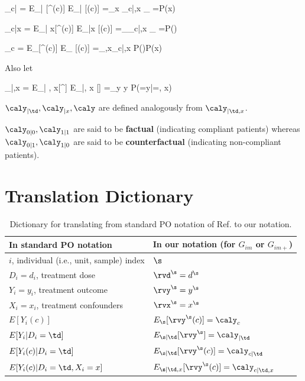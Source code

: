 \beq
\caly_{c|\td}
=
E_{\s| \td}[\rvy^\s(c)]
\rarrow
E_{\rvy|\td} [\rvy(c)]
=\sum_x \caly_{c|\td,x}
_
{=P(x)}
\eeq


\beq
\caly_{c|x}
=
E_{\s| x}[\rvy^\s(c)]
\rarrow
E_{\rvy|x} [\rvy(c)]
=\sum_\td \caly_{c|\td,x}
_
{=P(\td) }
\eeq

\beq
\caly_{c}
=
E_{\s}[\rvy^\s(c)]
\rarrow
E_{\rvy} [\rvy(c)]
=\sum_{\td,x}\caly_{c|\td,x}
 P(\td)P(x)
\eeq

Also let

\beq
\caly_{|\td,x}
=
E_{\s| \td, x}[\rvy^\s]
\rarrow
E_{\rvy|\td, x} [\rvy]
=\sum_y y P(\rvy=y|\rvtd=\td, x)
\eeq


$\caly_{|\td}, \caly_{|x}, \caly$ are 
defined analogously from 
$\caly_{|\td, x}$.

$\caly_{0|0}, \caly_{1|1}$
are said to be {\bf factual}
(indicating compliant patients)
whereas
$\caly_{0|1}, \caly_{1|0}$
are said to be {\bf counterfactual}
(indicating non-compliant patients).


\section{Translation Dictionary}

{\renewcommand{\arraystretch}{1.5}
\begin{table}[h!]
\centering
\begin{tabular}{|l|l|}
\hline
\rowcolor[HTML]{ECF4FF}
In standard PO notation&
In our notation
(for $G_{im}$ or  $G_{im+}$)\\
\hline
$i$, individual (i.e., unit, sample) index& $\s$ \\
\hline
$D_i=d_i$, treatment dose & $\rvd^\s=d^\s$\\
\hline
$Y_i=y_i$, treatment outcome& $\rvy^\s=y^\s$ \\
\hline
$X_i=x_i$, treatment confounders& $\rvx^\s=x^\s$ \\
\hline
$E[Y_i(c)]$ &
$E_{\s}[\rvy^\s(c)]=\caly_{c}$ \\
\hline
$E[Y_i|D_i=\td]$ &
$ E_{\s|\td}[\rvy^\s]=\caly_{|\td}$\\
\hline
$E[Y_i(c)|D_i=\td]$ &
$E_{\s|\td}[\rvy^\s(c)]=\caly_{c|\td}$\\
\hline
$E[Y_i(c)|D_i=\td, X_i=x]$ &
$E_{\s|\td,x}[\rvy^\s(c)]=\caly_{c|\td,x}$\\
\hline
\end{tabular}
\caption{Dictionary for
translating
from standard PO notation
of Ref.\cite{book-mixtape} to our notation.
}
\label{tab-pot-out-dict}
\end{table}
}


